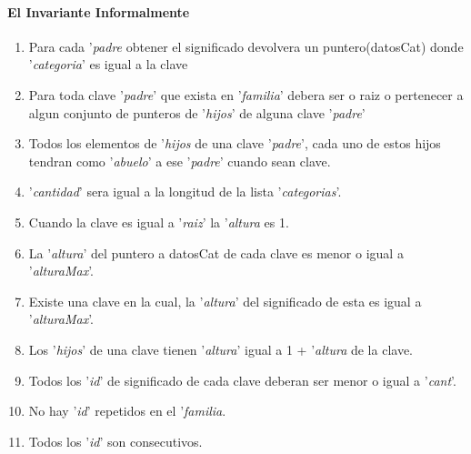 \paragraph{El Invariante Informalmente}
\begin{enumerate}
\item Para cada '\textit{padre} obtener el significado devolvera un puntero(datosCat) donde '\textit{categoria}' es igual a la clave
\item Para toda clave '\textit{padre}' que exista en '\textit{familia}' debera ser o raiz o pertenecer a algun conjunto de punteros de '\textit{hijos}' de alguna clave '\textit{padre}'
\item Todos los elementos de '\textit{hijos} de una clave '\textit{padre}', cada uno de estos hijos tendran como '\textit{abuelo}' a ese '\textit{padre}' cuando sean clave.
\item '\textit{cantidad}' sera igual a la longitud de la lista '\textit{categorias}'.
\item Cuando la clave es igual a '\textit{raiz}' la '\textit{altura} es 1.
\item La '\textit{altura}' del puntero a datosCat de cada clave es menor o igual a '\textit{alturaMax}'.
\item Existe una clave en la cual, la '\textit{altura}' del significado de esta es igual a '\textit{alturaMax}'.
\item Los '\textit{hijos}' de una clave tienen '\textit{altura}' igual a 1 + '\textit{altura} de la clave.
\item Todos los '\textit{id}' de significado de cada clave deberan ser menor o igual a '\textit{cant}'.
\item No hay '\textit{id}' repetidos en el '\textit{familia}.
\item Todos los '\textit{id}' son consecutivos.

\end{enumerate}

